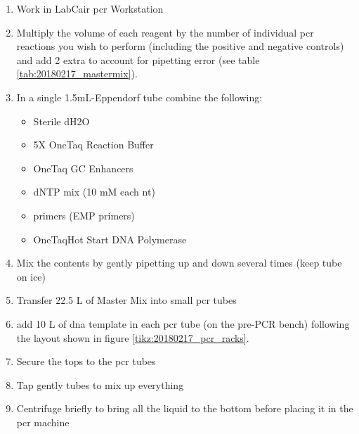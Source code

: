 \begin{enumerate}
\item Work in LabCair \gls{pcr} Workstation
\item Multiply the volume of each reagent by the number of individual \gls{pcr} reactions you wish to perform (including the positive and negative controls) and add 2 extra to account for pipetting error (see table \ref{tab:20180217_mastermix}).
\item In a single 1.5mL-Eppendorf tube combine the following:
	\begin{itemize}
	\item Sterile dH2O
	\item 5X OneTaq Reaction Buffer
	\item OneTaq GC Enhancers
	\item dNTP mix (10 mM each nt)
	\item primers (EMP primers)
	\item OneTaq\cR Hot Start DNA Polymerase
	\end{itemize}
\item Mix the contents by gently pipetting up and down several times (keep tube on ice)
\item Transfer  22.5 \textmu L of Master Mix into small \gls{pcr} tubes
\item add 10 \textmu L of \gls{dna} template in each \gls{pcr} tube (on the pre-PCR bench) following the layout shown in figure \ref{tikz:20180217_pcr_racks}.
\item Secure the tops to the \gls{pcr} tubes
\item Tap gently tubes to mix up everything
\item Centrifuge briefly to bring all the liquid to the bottom before placing it in the \gls{pcr} machine
\end{enumerate}

